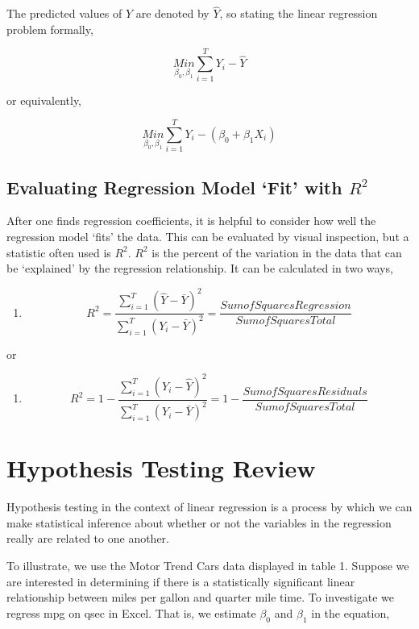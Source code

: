 \documentclass[]{book}
\providecommand{\tightlist}{%
  \setlength{\itemsep}{0pt}\setlength{\parskip}{0pt}}
\theoremstyle{definition}
\theoremstyle{definition}
\theoremstyle{remark}
\begin{document}
The predicted values of \(Y\) are denoted by \(\hat{Y}\), so stating the
linear regression problem formally,

\[\underset{\beta_0, \beta_1}{Min} \sum_{i=1}^{T} Y_i - \hat{Y}\]

or equivalently,

\[\underset{\beta_0, \beta_1}{Min} \sum_{i=1}^{T} Y_i - (\beta_0 + \beta_1X_i)\]

\subsection{\texorpdfstring{Evaluating Regression Model `Fit' with
\(R^2\)}{Evaluating Regression Model Fit with R\^{}2}}\label{evaluating-regression-model-fit-with-r2}

After one finds regression coefficients, it is helpful to consider how
well the regression model `fits' the data. This can be evaluated by
visual inspection, but a statistic often used is \(R^2\). \(R^2\) is the
percent of the variation in the data that can be `explained' by the
regression relationship. It can be calculated in two ways,

\begin{enumerate}
\def\labelenumi{\arabic{enumi}.}
\setcounter{enumi}{7}
\tightlist
\item
  \[R^2 = \frac{\sum_{i=1}^{T} (\hat{Y} - \bar{Y})^2}{\sum_{i=1}^{T} (Y_i - \bar{Y})^2} = \frac{SumofSquaresRegression}{SumofSquaresTotal}\]
\end{enumerate}

or

\begin{enumerate}
\def\labelenumi{\arabic{enumi}.}
\setcounter{enumi}{8}
\tightlist
\item
  \[R^2 = 1- \frac{\sum_{i=1}^{T} (Y_i - \hat{Y})^2}{\sum_{i=1}^{T} (Y_i - \bar{Y})^2} = 1 - \frac{SumofSquaresResiduals}{SumofSquaresTotal}\]
\end{enumerate}

\section{Hypothesis Testing Review}\label{hypothesis-testing-review}

Hypothesis testing in the context of linear regression is a process by
which we can make statistical inference about whether or not the
variables in the regression really are related to one another.

To illustrate, we use the Motor Trend Cars data displayed in table 1.
Suppose we are interested in determining if there is a statistically
significant linear relationship between miles per gallon and quarter
mile time. To investigate we regress mpg on qsec in Excel. That is, we
estimate \(\beta_0\) and \(\beta_1\) in the equation,
\end{document}
